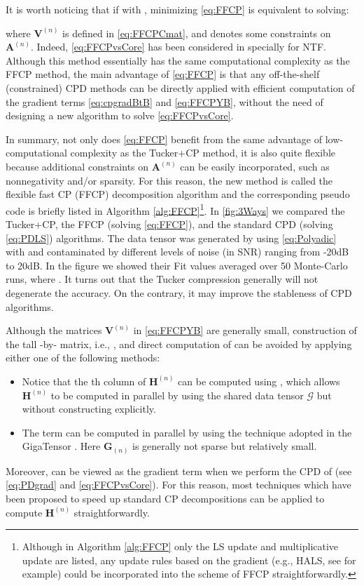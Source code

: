 \documentclass[10pt,twocolumn,twoside]{IEEEtran}
\newcommand{\tensor}[1]{\ensuremath{\boldsymbol{\mathscr{#1}}}}
\newcommand{\tenmat}[2][n]{\ensuremath{{\mathbf{#2}}_{(#1)}}}
\newcommand{\matn}[2][n]{\ensuremath{\mathbf{#2}^{(#1)}}}
\begin{document}
It is worth noticing that if  with ,  minimizing \eqref{eq:FFCP} is equivalent to solving:

where  \matn{V} is defined in \eqref{eq:FFCPCmat}, and  denotes some constraints on \matn{A}. Indeed, \eqref{eq:FFCPvsCore} has been considered in \cite{ComonNTF}  specially for NTF. Although this method essentially has the same computational complexity as the FFCP method,  the main advantage of \eqref{eq:FFCP} is that any off-the-shelf (constrained) CPD methods can be directly applied with efficient computation of the gradient terms \eqref{eq:cpgradBtB} and \eqref{eq:FFCPYB},  without the need of designing a new algorithm to solve \eqref{eq:FFCPvsCore}.

In summary, not only does \eqref{eq:FFCP} benefit from the same advantage of low-computational complexity as the Tucker+CP method, it is also quite flexible because additional constraints on \matn{A} can be easily incorporated, such as nonnegativity and/or sparsity. For this reason, the new method is called the flexible fast CP (FFCP) decomposition algorithm and the corresponding pseudo code is briefly listed in Algorithm \ref{alg:FFCP}\footnote{ Although in Algorithm \ref{alg:FFCP} only the LS update and multiplicative update are listed, any update rules based on the gradient (e.g., HALS, see \cite{SPM_NMFNTD} for example) could be incorporated into the scheme of FFCP straightforwardly.}. In \figurename \ref{fig:3Ways} we compared the Tucker+CP, the FFCP (solving \eqref{eq:FFCP}), and the standard CPD (solving \eqref{eq:PDLS}) algorithms. The data tensor  was generated by using \eqref{eq:Polyadic} with  and contaminated by different levels of noise (in SNR) ranging from -20dB to 20dB. In the figure we showed their Fit values averaged over 50 Monte-Carlo runs, where . It turns out that the Tucker compression generally will not degenerate the accuracy. On the contrary, it may improve the stableness of CPD algorithms.







Although the matrices \matn{V} in \eqref{eq:FFCPYB} are generally small,  construction of the  tall -by- matrix, i.e., , and  direct computation of  can be avoided by applying either one of the following methods:
\begin{itemize}
\item Notice that the th column of \matn{H} can be computed using  , which allows \matn{H} to be computed in parallel by using the shared data tensor \tensor{G} but without constructing   explicitly.

\item The term  can be computed in parallel by using the technique adopted in the GigaTensor \cite{GigaTensor}. Here \tenmat{G} is generally not sparse but relatively small.
\end{itemize}
Moreover,  can be viewed as the gradient term when we perform the CPD of  (see \eqref{eq:PDgrad} and \eqref{eq:FFCPvsCore}).  For this reason, most techniques which have been proposed to speed up standard CP decompositions  can be applied to compute \matn{H} straightforwardly. 
\end{document}
